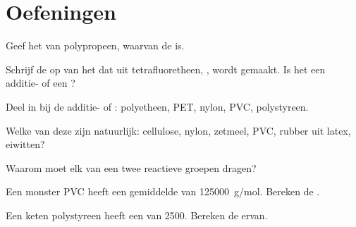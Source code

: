 \section{Oefeningen}

\begin{exercise}[$\star$]\label{exo:g12:polymers:1}
Geef het  van polypropeen, waarvan de 
 is.
\end{exercise}

\begin{exercise}[$\star$]\label{exo:g12:polymers:2}
Schrijf de  op van het  dat uit
tetrafluoretheen,
, wordt gemaakt. Is het een additie- of een
?
\end{exercise}

\begin{exercise}[$\star$]\label{exo:g12:polymers:3}
Deel in bij de additie- of : polyetheen, PET, nylon,
PVC, polystyreen.
\end{exercise}

\begin{exercise}[$\star$]\label{exo:g12:polymers:4}
Welke van deze  zijn natuurlijk: cellulose, nylon, zetmeel, PVC,
rubber uit latex, eiwitten?
\end{exercise}

\begin{exercise}[$\star$]\label{exo:g12:polymers:5}
Waarom moet elk  van een  twee reactieve
groepen dragen?
\end{exercise}

\begin{exercise}[$\star\star$]\label{exo:g12:polymers:6}
Een monster PVC heeft een gemiddelde  van
\qty{125000}{g/mol}. Bereken de .
\end{exercise}

\begin{exercise}[$\star\star$]\label{exo:g12:polymers:7}
Een keten polystyreen heeft een  van 2500. Bereken de
 ervan.
\end{exercise}


